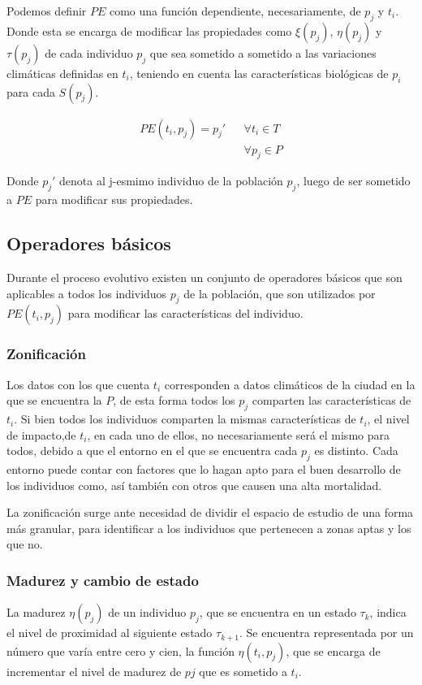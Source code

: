 Podemos definir $PE$ como una función dependiente, necesariamente, de $p_{j}$ y $t_{i}$. Donde esta se encarga
de modificar las propiedades como $\xi(p_{j})$, $\eta(p_{j})$ y $\tau(p_{j})$ de cada individuo $p_{j}$ que sea
sometido a sometido a las variaciones climáticas definidas en $t_{i}$, teniendo en  cuenta las características
biológicas de $p_{i}$ para cada $S(p_{j})$.

\begin{align*}
PE (t_{i}, p_{j}) = p_{j}' & & \forall t_{i} \in T\\
& & \forall p_{j} \in P 
\end{align*}

Donde $p_{j}'$ denota al j-esmimo individuo de la población $p_{j}$, luego de ser sometido a $PE$ para modificar
sus propiedades.  

\subsection{Operadores básicos}

Durante el proceso evolutivo existen un conjunto de operadores básicos que son aplicables a todos los individuos
$p_{j}$ de la población, que son utilizados por $PE(t_{i},p_{j})$ para modificar las características del 
individuo.

\subsubsection{Zonificación}
Los datos con los que cuenta $t_{i}$ corresponden a datos climáticos de la ciudad en la que se encuentra la
$P$, de esta forma todos los $p_{j}$ comparten las características de $t_{i}$. Si bien todos los individuos
comparten la mismas características de $t_{i}$, el nivel de impacto,de $t_{i}$, en cada uno de ellos, no
necesariamente será el mismo para todos, debido a que el entorno en el que se encuentra cada $p_{j}$ es 
distinto. Cada entorno puede contar con factores que lo hagan apto para el buen desarrollo de los individuos
como, así también con otros que causen una alta mortalidad.

La zonificación surge ante necesidad de dividir el espacio de estudio de una forma más granular, para identificar
a los individuos que pertenecen a zonas aptas y los que no. 

\subsubsection{Madurez y cambio de estado}
La madurez $\eta (p_{j})$ de un individuo $p_{j}$, que se encuentra en un estado $\tau_{k}$, indica el nivel de
proximidad al siguiente estado $\tau_{k+1}$. Se encuentra representada por un número que varía entre
cero y cien, la función $\eta (t_{i}, p_{j})$, que se encarga de incrementar el nivel de madurez de $p{j}$
que es sometido a $t_{i}$.

